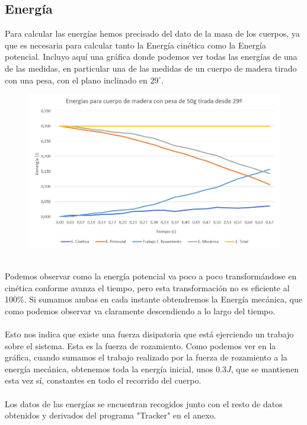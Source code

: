\documentclass{article}
\begin{document}
    \subsection{Energía}
    Para calcular las energías hemos precisado del dato de la masa de los cuerpos, ya que es necesaria para calcular tanto la Energía cinética como la Energía potencial. Incluyo aquí una gráfica donde podemos ver todas las energías de una de las medidas, en particular una de las medidas de un cuerpo de madera tirado con una pesa, con el plano inclinado en $29^{\circ}$.\\
        \begin{figure}[h]
        \centering
        \includegraphics[width=.95\textwidth]{fotos/datos/Energías mcp2.jpg}
        \end{figure}\\
    Podemos observar como la energía potencial va poco a poco transformándose en cinética conforme avanza el tiempo, pero esta transformación no es eficiente al 100\%. Si sumamos ambas en cada instante obtendremos la Energía mecánica, que como podemos observar va claramente descendiendo a lo largo del tiempo. \\\\
    Esto nos indica que existe una fuerza disipatoria que está ejerciendo un trabajo sobre el sistema. Esta es la fuerza de rozamiento. Como podemos ver en la gráfica, cuando sumamos el trabajo realizado por la fuerza de rozamiento a la energía mecánica, obtenemos toda la energía inicial, unos $0.3 J$, que se mantienen esta vez sí, constantes en todo el recorrido del cuerpo.\\\\
    Los datos de las energías se encuentran recogidos junto con el resto de datos obtenidos y derivados del programa "Tracker" en el anexo.
\end{document}
